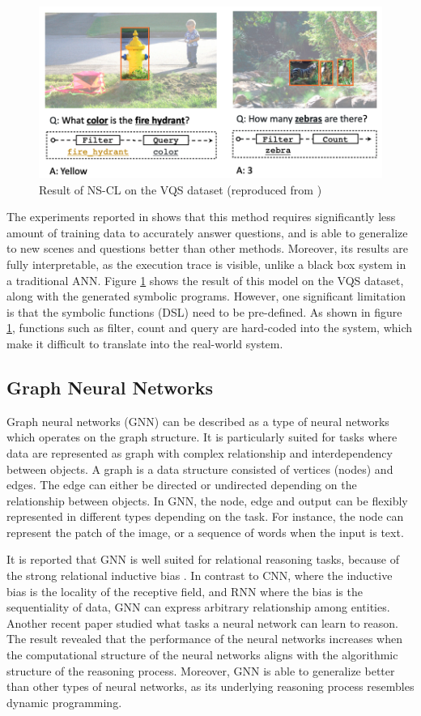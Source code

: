 \documentclass[journal]{IEEEtran}
\begin{document}
\begin{figure}[htb]
  \centering
  \includegraphics[width=0.8\columnwidth]{nscl.png}
  \caption{Result of NS-CL on the VQS dataset (reproduced from \cite{Mao2019NeuroSymbolic})}
  \label{nscl}
\end{figure}

The experiments reported in \cite{Mao2019NeuroSymbolic} shows that this method requires significantly less amount of training data to accurately answer questions, 
and is able to generalize to new scenes and questions better than other methods. 
Moreover, its results are fully interpretable, as the execution trace is visible, 
unlike a black box system in a traditional ANN.
Figure \ref{nscl} shows the result of this model on the VQS dataset, along with the generated symbolic programs. 
However, one significant limitation is that the symbolic functions (DSL) need to be pre-defined. 
As shown in figure \ref{nscl}, functions such as filter, count and query are hard-coded into the system, 
which make it difficult to translate into the real-world system.

\subsection{Graph Neural Networks}

Graph neural networks (GNN) can be described as a type of neural networks which operates on the graph structure.
It is particularly suited for tasks where data are represented as graph with complex relationship and interdependency between objects.
A graph is a data structure consisted of vertices (nodes) and edges.
The edge can either be directed or undirected depending on the relationship between objects.
In GNN, the node, edge and output can be flexibly represented in different types depending on the task. 
For instance, the node can represent the patch of the image, or a sequence of words when the input is text.

It is reported that GNN is well suited for relational reasoning tasks, because of the strong relational inductive bias \cite{graphnetworks}.
In contrast to CNN, where the inductive bias is the locality of the receptive field, 
and RNN where the bias is the sequentiality of data, GNN can express arbitrary relationship among entities. 
Another recent paper \cite{xu2019can} studied what tasks a neural network can learn to reason. 
The result revealed that the performance of the neural networks increases
when the computational structure of the neural networks aligns with the algorithmic structure of the reasoning process. 
Moreover, GNN is able to generalize better than other types of neural networks, 
as its underlying reasoning process resembles dynamic programming.
\end{document}
